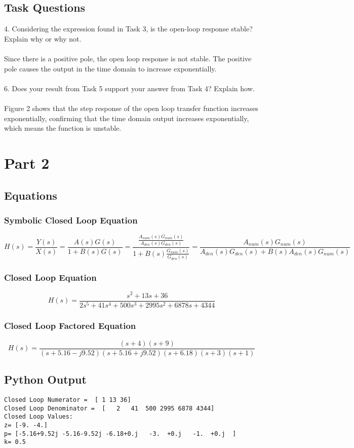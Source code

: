 \subsection{Task Questions}
4. Considering the expression found in Task 3, is the open-loop response stable? Explain why or why not. 
\\ \\
Since there is a positive pole, the open loop response is not stable.  The positive pole causes the output in the time domain to increase exponentially. 
\\ \\ 
6. Does your result from Task 5 support your answer from Task 4? Explain how.
\\ \\
Figure 2 shows that the step response of the open loop transfer function increases exponentially, confirming that the time domain output increases exponentially, which means the function is unstable.

\section{Part 2}
\subsection{Equations}
\subsubsection{Symbolic Closed Loop Equation}
\[H(s)=\dfrac{Y(s)}{X(s)}=\dfrac{A(s)G(s)}{1+B(s)G(s)}=\dfrac{\frac{A_{num}(s)G_{num}(s)}{A_{den}(s)G_{den}(s)}}
{1+B(s)\frac{G_{num}(s)}{G_{den}(s)}}=\dfrac{A_{num}(s)G_{num}(s)}{A_{den}(s)G_{den}(s)+B(s)A_{den}(s)G_{num}(s)}\]
\subsubsection{Closed Loop Equation}
\[H(s)=\dfrac{s^{2}+13s+36}{2s^{5}+41s^{4}+500s^{3}+2995s^{2}+6878s+4344}\]
\subsubsection{Closed Loop Factored Equation}
\[H(s)=\dfrac{(s+4)(s+9)}{(s+5.16-j9.52)(s+5.16+j9.52)(s+6.18)(s+3)(s+1)}\]

\subsection{Python Output}
\begin{small}
\begin{lstlisting}
Closed Loop Numerator =  [ 1 13 36]
Closed Loop Denominator =  [   2   41  500 2995 6878 4344]
Closed Loop Values: 
z= [-9. -4.]
p= [-5.16+9.52j -5.16-9.52j -6.18+0.j   -3.  +0.j   -1.  +0.j  ]
k= 0.5
\end{lstlisting}
\end{small}

